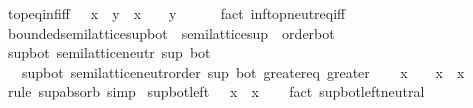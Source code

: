 \begin{isabellebody}
\isanewline
{}\isamarkupfalse%
\ top{\isacharunderscore}{\kern0pt}eq{\isacharunderscore}{\kern0pt}inf{\isacharunderscore}{\kern0pt}iff{\isacharcolon}{\kern0pt}\ {\isachardoublequoteopen}{\isasymtop}\ {\isacharequal}{\kern0pt}\ x\ {\isasymsqinter}\ y\ {\isasymlongleftrightarrow}\ x\ {\isacharequal}{\kern0pt}\ {\isasymtop}\ {\isasymand}\ y\ {\isacharequal}{\kern0pt}\ {\isasymtop}{\isachardoublequoteclose}\isanewline
%
\isadelimproof
\ \ %
\endisadelimproof
%
\isatagproof
{}\isamarkupfalse%
\ {\isacharparenleft}{\kern0pt}fact\ inf{\isacharunderscore}{\kern0pt}top{\isachardot}{\kern0pt}neutr{\isacharunderscore}{\kern0pt}eq{\isacharunderscore}{\kern0pt}iff{\isacharparenright}{\kern0pt}%
\endisatagproof
{\isafoldproof}%
%
\isadelimproof
\isanewline
%
\endisadelimproof
\isanewline
{}\isamarkupfalse%
\isanewline
\isanewline
{}\isamarkupfalse%
\ bounded{\isacharunderscore}{\kern0pt}semilattice{\isacharunderscore}{\kern0pt}sup{\isacharunderscore}{\kern0pt}bot\ {\isacharequal}{\kern0pt}\ semilattice{\isacharunderscore}{\kern0pt}sup\ {\isacharplus}{\kern0pt}\ order{\isacharunderscore}{\kern0pt}bot\isanewline
{}\isanewline
\isanewline
{}\isamarkupfalse%
\ sup{\isacharunderscore}{\kern0pt}bot{\isacharcolon}{\kern0pt}\ semilattice{\isacharunderscore}{\kern0pt}neutr\ sup\ bot\isanewline
\ \ {\isacharplus}{\kern0pt}\ sup{\isacharunderscore}{\kern0pt}bot{\isacharcolon}{\kern0pt}\ semilattice{\isacharunderscore}{\kern0pt}neutr{\isacharunderscore}{\kern0pt}order\ sup\ bot\ greater{\isacharunderscore}{\kern0pt}eq\ greater\isanewline
%
\isadelimproof
%
\endisadelimproof
%
\isatagproof
{}\isamarkupfalse%
\isanewline
\ \ \isamarkupfalse%
\ {\isachardoublequoteopen}x\ {\isasymsqunion}\ {\isasymbottom}\ {\isacharequal}{\kern0pt}\ x{\isachardoublequoteclose}\ \ x\isanewline
\ \ \ \ \isamarkupfalse%
\ {\isacharparenleft}{\kern0pt}rule\ sup{\isacharunderscore}{\kern0pt}absorb{}{\isacharparenright}{\kern0pt}\ simp\isanewline
{}\isamarkupfalse%
%
\endisatagproof
{\isafoldproof}%
%
\isadelimproof
\isanewline
%
\endisadelimproof
\isanewline
{}\isamarkupfalse%
\ sup{\isacharunderscore}{\kern0pt}bot{\isacharunderscore}{\kern0pt}left{\isacharcolon}{\kern0pt}\ {\isachardoublequoteopen}{\isasymbottom}\ {\isasymsqunion}\ x\ {\isacharequal}{\kern0pt}\ x{\isachardoublequoteclose}\isanewline
%
\isadelimproof
\ \ %
\endisadelimproof
%
\isatagproof
{}\isamarkupfalse%
\ {\isacharparenleft}{\kern0pt}fact\ sup{\isacharunderscore}{\kern0pt}bot{\isachardot}{\kern0pt}left{\isacharunderscore}{\kern0pt}neutral{\isacharparenright}{\kern0pt}%

\end{isabellebody}
